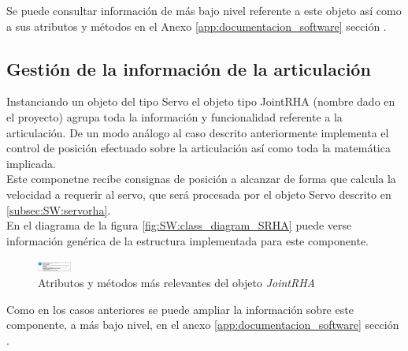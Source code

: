         Se puede consultar información de más bajo nivel referente a este objeto así como a sus atributos y métodos en el Anexo \ref{app:documentacion_software} sección \completar.

    \subsection{Gestión de la información de la articulación} \label{subsec:SW:jointrha}
        Instanciando un objeto del tipo Servo el objeto tipo JointRHA (nombre dado en el proyecto) agrupa toda la información y funcionalidad referente a la articulación. De un modo análogo al caso descrito anteriormente implementa el control de posición efectuado sobre la articulación así como toda la matemática implicada.
        \\
        Este componetne recibe consignas de posición a alcanzar de forma que calcula la velocidad a requerir al servo, que será procesada por el objeto Servo descrito en \ref{subsec:SW:servorha}.
        \\
        En el diagrama de la figura \ref{fig:SW:class_diagram_SRHA} puede verse información genérica de la estructura implementada para este componente.
        \begin{figure}[H]
            \centering
            \includegraphics[width=0.100\textwidth]{figuras/Imagenes_SW/class_diagram_JRHA.jpg}
            \caption{Atributos y métodos más relevantes del objeto \textit{JointRHA}}
            \label{fig:SW:class_diagram_JRHA}
        \end{figure}

        Como en los casos anteriores se puede ampliar la información sobre este componente, a más bajo nivel, en el anexo \ref{app:documentacion_software} sección \completar.
